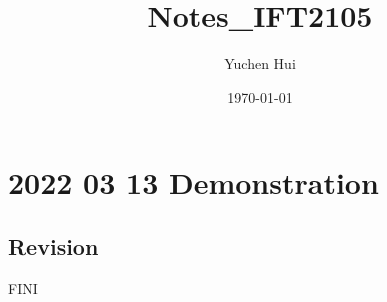 \documentclass{article}
\title{\textbf{Notes_IFT2105}}
\author{Yuchen Hui}
\date{\today}
\theoremstyle{definition}
\theoremstyle{remark}
\begin{document}
    \maketitle
    \tableofcontents
    \section{2022 03 13 Demonstration}
    \subsection{Revision}
    FINI 
\end{document}
